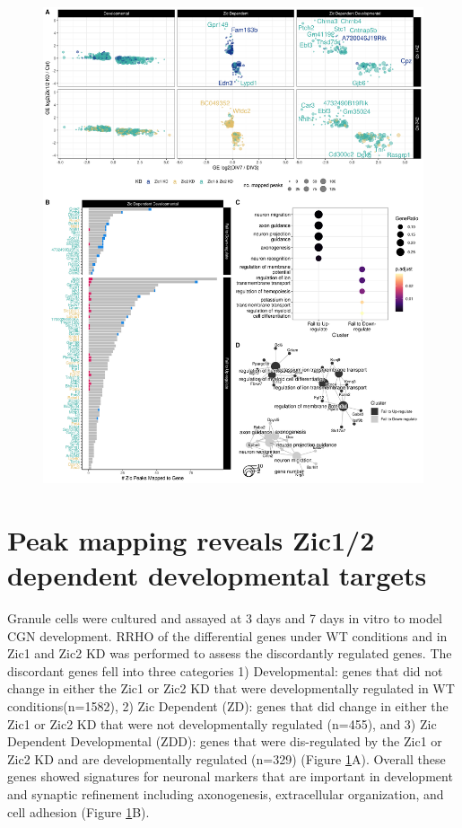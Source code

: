 \documentclass[fleqn,10pt,twocolumn]{wlscirep}
\begin{document}
\begin{figure}[!ht]
\includegraphics[width=.95\textwidth]{../figures/figure4.png}
\caption{}
\label{fig:ZicKD}
\end{figure}

\section*{Peak mapping reveals Zic1/2 dependent developmental targets}
Granule cells were cultured and assayed at 3 days and 7 days in vitro to model CGN development. RRHO of the differential genes under WT conditions and in Zic1 and Zic2 KD was performed to assess the discordantly regulated genes. The discordant genes fell into three categories 1) Developmental: genes that did not change in either the Zic1 or Zic2 KD that were developmentally regulated in WT conditions(n=1582), 2) Zic Dependent (ZD): genes that did change in either the Zic1 or Zic2 KD that were not developmentally regulated (n=455), and 3) Zic Dependent Developmental (ZDD): genes that were dis-regulated by the Zic1 or Zic2 KD and are developmentally regulated (n=329) (Figure \ref{fig:ZicKD}A). Overall these genes showed signatures for neuronal markers that are important in development and synaptic refinement including axonogenesis, extracellular organization, and cell adhesion (Figure \ref{fig:ZicKD}B). 
\end{document}
